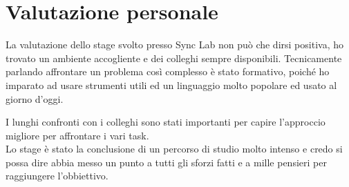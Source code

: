 \newpage
\section{Valutazione personale}
La valutazione dello stage svolto presso Sync Lab non può che dirsi positiva, ho trovato un ambiente accogliente e dei colleghi sempre disponibili. Tecnicamente parlando affrontare un problema così complesso è stato formativo, poiché ho imparato ad usare strumenti utili ed un linguaggio molto popolare ed usato al giorno d'oggi.

I lunghi confronti con i colleghi sono stati importanti per capire l'approccio migliore per affrontare i vari task.\\
Lo stage è stato la conclusione di un percorso di studio molto intenso e credo si possa dire abbia messo un punto a tutti gli sforzi fatti e a mille pensieri per raggiungere l'obbiettivo.